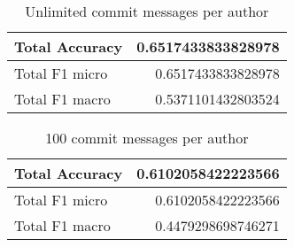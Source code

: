 \begin{table}[H]
  \def\arraystretch{1.15}%
  \centering
  \caption{Unlimited commit messages per author}
  \bigskip
  \begin{tabular}{| l | r |}
    \hline
    Total Accuracy & 0.6517433833828978 \\
    \hline
    Total F1 micro & 0.6517433833828978 \\
    \hline
    Total F1 macro & 0.5371101432803524 \\
    \hline
  \end{tabular}
\end{table}

\begin{table}[H]
  \def\arraystretch{1.15}%
  \centering
  \caption{100 commit messages per author}
  \bigskip
  \begin{tabular}{| l | r |}
    \hline
    Total Accuracy & 0.6102058422223566 \\
    \hline
    Total F1 micro & 0.6102058422223566 \\
    \hline
    Total F1 macro & 0.4479298698746271 \\
    \hline
  \end{tabular}
\end{table}

